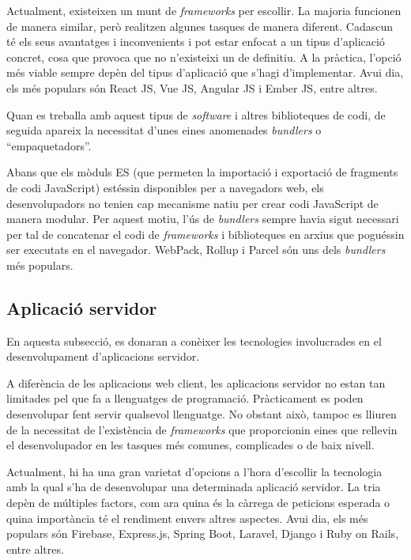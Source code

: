\documentclass[a4paper,12pt]{ThesisStyle}
\begin{document}
Actualment, existeixen un munt de \textit{frameworks} per escollir. La majoria funcionen de manera similar, però realitzen algunes tasques de manera diferent. Cadascun té els seus avantatges i inconvenients i pot estar enfocat a un tipus d'aplicació concret, cosa que provoca que no n'existeixi un de definitiu. A la pràctica, l'opció més viable sempre depèn del tipus d'aplicació que s'hagi d'implementar. Avui dia, els més populars són React JS, Vue JS, Angular JS i Ember JS, entre altres.

Quan es treballa amb aquest tipus de \textit{software} i altres biblioteques de codi, de seguida apareix la necessitat d'unes eines anomenades \textit{bundlers} o ``empaquetadors''.

Abans que els mòduls ES (que permeten la importació i exportació de fragments de codi JavaScript) estéssin disponibles per a navegadors web, els desenvolupadors no tenien cap mecanisme natiu per crear codi JavaScript de manera modular. Per aquest motiu, l'ús de \textit{bundlers} sempre havia sigut necessari per tal de concatenar el codi de \textit{frameworks} i biblioteques en arxius que poguéssin ser executats en el navegador. WebPack, Rollup i Parcel són uns dels \textit{bundlers} més populars.

\subsection{Aplicació servidor}
\label{subsec:aplicacio_servidor}

En aquesta subsecció, es donaran a conèixer les tecnologies involucrades en el desenvolupament d'aplicacions servidor.

A diferència de les aplicacions web client, les aplicacions servidor no estan tan limitades pel que fa a llenguatges de programació. Pràcticament es poden desenvolupar fent servir qualsevol llenguatge. No obstant això, tampoc es lliuren de la necessitat de l'existència de \textit{frameworks} que proporcionin eines que rellevin el desenvolupador en les tasques més comunes, complicades o de baix nivell.

Actualment, hi ha una gran varietat d'opcions a l'hora d'escollir la tecnologia amb la qual s'ha de desenvolupar una determinada aplicació servidor. La tria depèn de múltiples factors, com ara quina és la càrrega de peticions esperada o quina importància té el rendiment envers altres aspectes. Avui dia, els més populars són Firebase, Express.js, Spring Boot, Laravel, Django i Ruby on Rails, entre altres.
\end{document}
